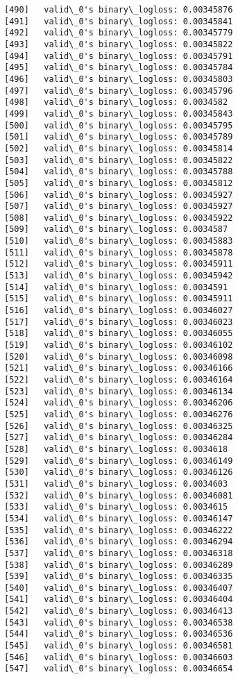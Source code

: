\documentclass[11pt]{article}
\begin{document}
\begin{Verbatim}[commandchars=\\\{\}]
[490]	valid\_0's binary\_logloss: 0.00345876
[491]	valid\_0's binary\_logloss: 0.00345841
[492]	valid\_0's binary\_logloss: 0.00345779
[493]	valid\_0's binary\_logloss: 0.00345822
[494]	valid\_0's binary\_logloss: 0.00345791
[495]	valid\_0's binary\_logloss: 0.00345784
[496]	valid\_0's binary\_logloss: 0.00345803
[497]	valid\_0's binary\_logloss: 0.00345796
[498]	valid\_0's binary\_logloss: 0.0034582
[499]	valid\_0's binary\_logloss: 0.00345843
[500]	valid\_0's binary\_logloss: 0.00345795
[501]	valid\_0's binary\_logloss: 0.00345789
[502]	valid\_0's binary\_logloss: 0.00345814
[503]	valid\_0's binary\_logloss: 0.00345822
[504]	valid\_0's binary\_logloss: 0.00345788
[505]	valid\_0's binary\_logloss: 0.00345812
[506]	valid\_0's binary\_logloss: 0.00345927
[507]	valid\_0's binary\_logloss: 0.00345927
[508]	valid\_0's binary\_logloss: 0.00345922
[509]	valid\_0's binary\_logloss: 0.0034587
[510]	valid\_0's binary\_logloss: 0.00345883
[511]	valid\_0's binary\_logloss: 0.00345878
[512]	valid\_0's binary\_logloss: 0.00345911
[513]	valid\_0's binary\_logloss: 0.00345942
[514]	valid\_0's binary\_logloss: 0.0034591
[515]	valid\_0's binary\_logloss: 0.00345911
[516]	valid\_0's binary\_logloss: 0.00346027
[517]	valid\_0's binary\_logloss: 0.00346023
[518]	valid\_0's binary\_logloss: 0.00346055
[519]	valid\_0's binary\_logloss: 0.00346102
[520]	valid\_0's binary\_logloss: 0.00346098
[521]	valid\_0's binary\_logloss: 0.00346166
[522]	valid\_0's binary\_logloss: 0.00346164
[523]	valid\_0's binary\_logloss: 0.00346134
[524]	valid\_0's binary\_logloss: 0.00346206
[525]	valid\_0's binary\_logloss: 0.00346276
[526]	valid\_0's binary\_logloss: 0.00346325
[527]	valid\_0's binary\_logloss: 0.00346284
[528]	valid\_0's binary\_logloss: 0.0034618
[529]	valid\_0's binary\_logloss: 0.00346149
[530]	valid\_0's binary\_logloss: 0.00346126
[531]	valid\_0's binary\_logloss: 0.0034603
[532]	valid\_0's binary\_logloss: 0.00346081
[533]	valid\_0's binary\_logloss: 0.0034615
[534]	valid\_0's binary\_logloss: 0.00346147
[535]	valid\_0's binary\_logloss: 0.00346222
[536]	valid\_0's binary\_logloss: 0.00346294
[537]	valid\_0's binary\_logloss: 0.00346318
[538]	valid\_0's binary\_logloss: 0.00346289
[539]	valid\_0's binary\_logloss: 0.00346335
[540]	valid\_0's binary\_logloss: 0.00346407
[541]	valid\_0's binary\_logloss: 0.00346404
[542]	valid\_0's binary\_logloss: 0.00346413
[543]	valid\_0's binary\_logloss: 0.00346538
[544]	valid\_0's binary\_logloss: 0.00346536
[545]	valid\_0's binary\_logloss: 0.00346581
[546]	valid\_0's binary\_logloss: 0.00346603
[547]	valid\_0's binary\_logloss: 0.00346654

\end{Verbatim}
\end{document}
